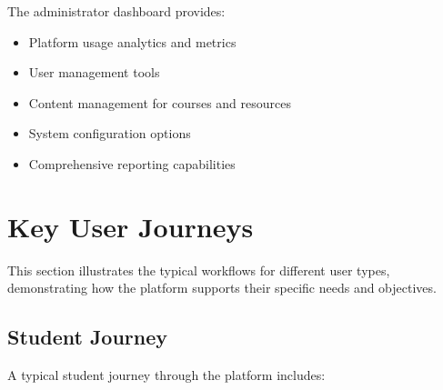 \documentclass[12pt,a4paper]{report}
\begin{document}
The administrator dashboard provides:

\begin{itemize}
    \item Platform usage analytics and metrics
    \item User management tools
    \item Content management for courses and resources
    \item System configuration options
    \item Comprehensive reporting capabilities
\end{itemize}

\section{Key User Journeys}

This section illustrates the typical workflows for different user types, demonstrating how the platform supports their specific needs and objectives.

\subsection{Student Journey}

A typical student journey through the platform includes:
\end{document}
